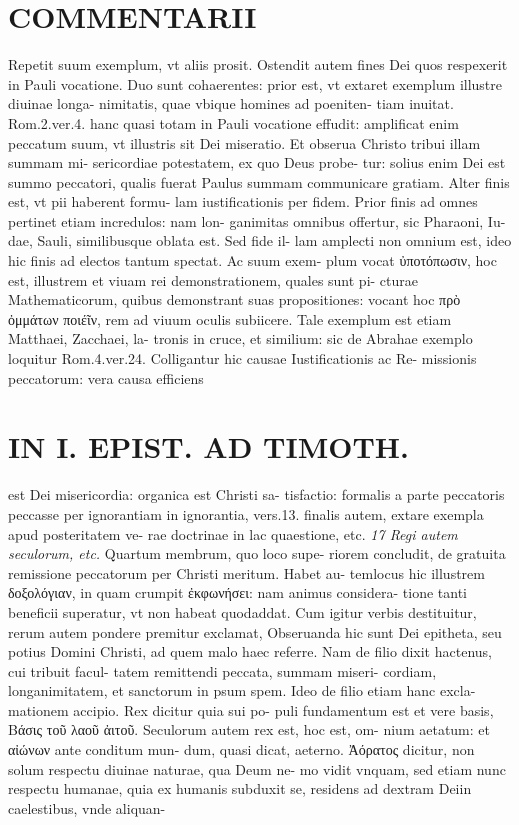 \documentclass{article}
\begin{document}
\begin{pages}
\section*{COMMENTARII }\pstart Repetit suum exemplum, vt aliis prosit. Ostendit autem fines Dei quos respexerit in Pauli vocatione. Duo sunt cohaerentes: prior est, vt extaret exemplum illustre diuinae longa- nimitatis, quae vbique homines ad poeniten- tiam inuitat. Rom.2.ver.4. hanc quasi totam in Pauli vocatione effudit: amplificat enim peccatum suum, vt illustris sit Dei miseratio. Et obserua Christo tribui illam summam mi- sericordiae potestatem, ex quo Deus probe- tur: solius enim Dei est summo peccatori, qualis fuerat Paulus summam communicare gratiam. Alter finis est, vt pii haberent formu- lam iustificationis per fidem. Prior finis ad omnes pertinet etiam incredulos: nam lon- ganimitas omnibus offertur, sic Pharaoni, Iu- dae, Sauli, similibusque oblata est. Sed fide il- lam amplecti non omnium est, ideo hic finis ad electos tantum spectat. Ac suum exem- plum vocat ὐποτόπωσιν, hoc est, illustrem et viuam rei demonstrationem, quales sunt pi- cturae Mathematicorum, quibus demonstrant suas propositiones: vocant hoc πρὸ ὀμμάτων ποιέῖν, rem ad viuum oculis subiicere. Tale exemplum est etiam Matthaei, Zacchaei, la- tronis in cruce, et similium: sic de Abrahae exemplo loquitur Rom.4.ver.24. Colligantur hic causae Iustificationis ac Re-  \pend\pstart missionis peccatorum: vera causa efficiens  \pend
\section*{IN I. EPIST. AD TIMOTH. }
\marginpar{[ p.37 ]}\pstart est Dei misericordia: organica est Christi sa- tisfactio: formalis a parte peccatoris peccasse per ignorantiam in ignorantia, vers.13. finalis autem, extare exempla apud posteritatem ve- rae doctrinae in lac quaestione, etc.  \pend
\textit{17 Regi autem seculorum, etc. }\pstart Quartum membrum, quo loco supe- riorem concludit, de gratuita remissione peccatorum per Christi meritum. Habet au- temlocus hic illustrem δοξολόγιαν, in quam crumpit ἐκφωνήσει: nam animus considera- tione tanti beneficii superatur, vt non habeat quodaddat. Cum igitur verbis destituitur, rerum autem pondere premitur exclamat, Obseruanda hic sunt Dei epitheta, seu potius Domini Christi, ad quem malo haec referre. Nam de filio dixit hactenus, cui tribuit facul- tatem remittendi peccata, summam miseri- cordiam, longanimitatem, et sanctorum in psum spem. Ideo de filio etiam hanc excla- mationem accipio. Rex dicitur quia sui po- puli fundamentum est et vere basis, Βάσις τοῦ λαοῦ ἀιτοῦ. Seculorum autem rex est, hoc est, om- nium aetatum: et αἰώνων ante conditum mun- dum, quasi dicat, aeterno. Ἀόρατος dicitur, non solum respectu diuinae naturae, qua Deum ne- mo vidit vnquam, sed etiam nunc respectu humanae, quia ex humanis subduxit se, residens ad dextram Deiin caelestibus, vnde aliquan-  \pend
\marginpar{[ p.36 ]}

\end{pages}
\end{document}
